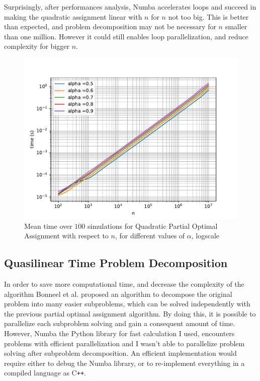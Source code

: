 \documentclass[a4paper,12pt]{article}
\begin{document}
Surprisingly, after performances analysis, Numba accelerates loops and succeed in making the quadratic assignment linear with $n$ for $n$ not too big. This is better than expected, and problem decomposition may not be necessary for $n$ smaller than one million. However it could still enables loop parallelization, and reduce complexity for bigger $n$.

\begin{figure}[H]
\includegraphics[width = \columnwidth]{a_time.pdf}
\caption{Mean time over $100$ simulations for Quadratic Partial Optimal Assignment with respect to $n$, for different values of $\alpha$, logscale}\label{a_time}
\end{figure}


\subsection{Quasilinear Time Problem Decomposition}

In order to save more computational time, and decrease the complexity of the algorithm Bonneel et al. \cite{BC19} proposed an algorithm to decompose the original problem into many easier subproblems, which can be solved independently with the previous partial optimal assignment algorithm. By doing this, it is possible to parallelize each subproblem solving and gain a consequent amount of time. However, Numba \cite{10.1145/2833157.2833162} the Python library for fast calculation I used, encounters problems with efficient parallelization and I wasn't able to parallelize problem solving after subproblem decomposition. An efficient implementation would require either to debug the Numba library, or to re-implement everything in a compiled language as C\texttt{++}.
\end{document}
